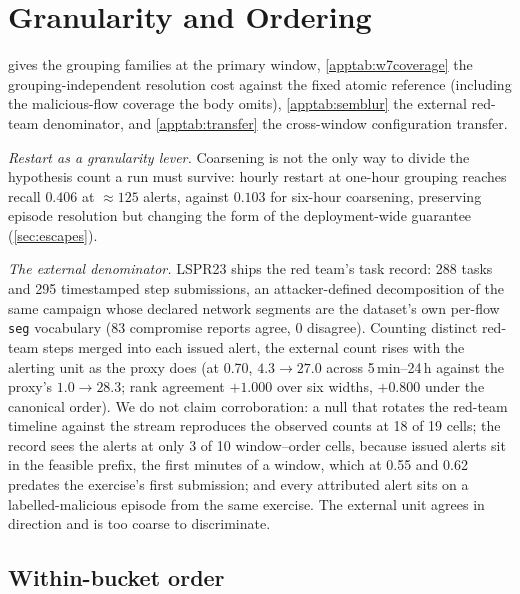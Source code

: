 \documentclass[conference]{IEEEtran}
\begin{document}
\section{Granularity and Ordering}\label{app:granularity}

 gives the grouping families at the primary window, \cref{apptab:w7coverage} the
grouping-independent resolution cost against the fixed atomic reference (including the malicious-flow
coverage the body omits), \cref{apptab:semblur} the external red-team denominator, and
\cref{apptab:transfer} the cross-window configuration transfer.

\emph{Restart as a granularity lever.} Coarsening is not the only way to divide the hypothesis count a
run must survive: hourly restart at one-hour grouping reaches recall $0.406$ at $\approx125$ alerts,
against $0.103$ for six-hour coarsening, preserving episode resolution but changing the form of the
deployment-wide guarantee (\cref{sec:escapes}).

\emph{The external denominator.} LSPR23 ships the red team's task record: 288 tasks and 295 timestamped
step submissions, an attacker-defined decomposition of the same campaign whose declared network segments
are the dataset's own per-flow \texttt{seg} vocabulary (83 compromise reports agree, 0 disagree).
Counting distinct red-team steps merged into each issued alert, the external count rises with the
alerting unit as the proxy does (at 0.70, $4.3\to27.0$ across 5\,min--24\,h against the proxy's
$1.0\to28.3$; rank agreement $+1.000$ over six widths, $+0.800$ under the canonical order). We do not
claim corroboration: a null that rotates the red-team timeline against the stream reproduces the observed
counts at 18 of 19 cells; the record sees the alerts at only 3 of 10 window--order cells, because issued
alerts sit in the feasible prefix, the first minutes of a window, which at 0.55 and 0.62 predates the
exercise's first submission; and every attributed alert sits on a labelled-malicious episode from the same
exercise. The external unit agrees in direction and is too coarse to discriminate.



\subsection{Within-bucket order}\label{sec:transfer}
\end{document}
